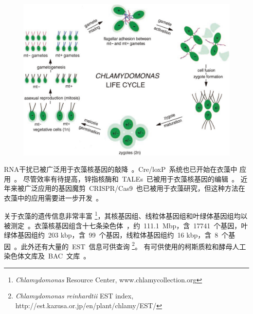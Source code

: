 \begin{asparaitem}[\DiamondSolid]
\begin{figure}[tbhp]
\centering
\graphicspath{{figures/}}
\includegraphics[width=\textwidth-10mm]{fig2-2.jpg}
{
\par}
\end{figure}

\item RNA干扰已被广泛用于衣藻核基因的敲降\
    \citep{Hu2014,Schmollinger2010,Zhao2009,Molnar2009}。Cre/loxP\ 系统也已开始在衣藻中
    应用\ \citep{Kasai2016}。 尽管效率有待提高，锌指核酶和\ TALEs\ 已被用于衣藻核基因的编辑\
    \citep{Jinkerson2015,Mussgnug2015}。 近年来被广泛应用的基因魔剪\ CRISPR/Cas9\
    也已被用于衣藻研究，但这种方法在衣藻中的应用需要进一步开发\
    \citep{Jiang2014,Shin2016,Baek2016,Lander2016a}。

\item 关于衣藻的遗传信息非常丰富
\footnote{\textit{Chlamydomonas} Resource Center, www.chlamycollection.org}，其核基因组、线粒体基因组和叶绿体基因组均以被测定\
    \citep{Grossman2003,Maul2002,Mussgnug2015,Gallaher2015,Flowers2015}。衣藻核基因组含十七条染色体\
    \citep{Dutcher1991}，约\ 111.1\ Mbp，含\ 17741\ 个基因，叶绿体基因组约\ 203 kbp，含\ 99\ 个基因，线粒体基因组约\ 16 kbp，含\ 8\ 个基因\ \citep{Jinkerson2015,Mussgnug2015}。此外还有大量的\ EST\ 信息可供查询
    \footnote{\textit{Chlamydomonas reinhardtii} EST index, http://est.kazusa.or.jp/en/plant/chlamy/EST/}。 有可供使用的柯斯质粒和酵母人工染色体文库及\ BAC\ 文库\
    \citep{Blaby2014}。


\end{asparaitem}
